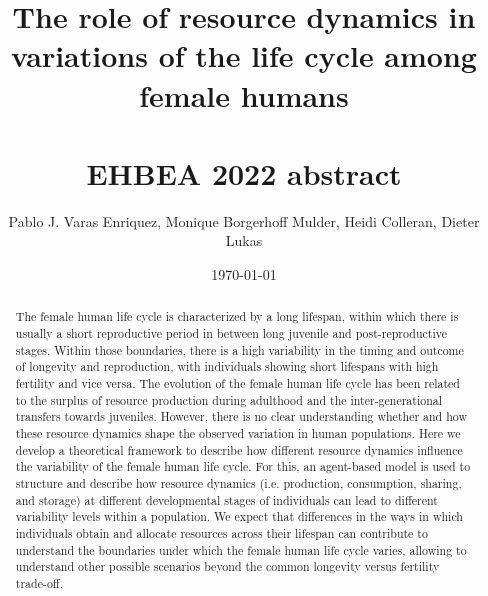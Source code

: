 \documentclass{article}
\title{The role of resource dynamics in variations of the life cycle among female humans\\\\
EHBEA 2022 abstract}
\author{Pablo J. Varas Enriquez, Monique Borgerhoff Mulder, Heidi Colleran, Dieter Lukas}
\date{\today}
\begin{document}
\maketitle

\begin{abstract}
    The female human life cycle is characterized by a long lifespan, within which there is usually a short reproductive period in between long juvenile and post-reproductive stages. Within those boundaries, there is a high variability in the timing and outcome of longevity and reproduction, with individuals showing short lifespans with high fertility and vice versa. The evolution of the female human life cycle has been related to the surplus of resource production during adulthood and the inter-generational transfers towards juveniles. However, there is no clear understanding whether and how these resource dynamics shape the observed variation in human populations. Here we develop a theoretical framework to describe how different resource dynamics influence the variability of the female human life cycle. For this, an agent-based model is used to structure and describe how resource dynamics (i.e. production, consumption, sharing, and storage) at different developmental stages of individuals can lead to different variability levels within a population. We expect that differences in the ways in which individuals obtain and allocate resources across their lifespan can contribute to understand the boundaries under which the female human life cycle varies, allowing to understand other possible scenarios beyond the common longevity versus fertility trade-off.
\end{abstract}
\end{document}
